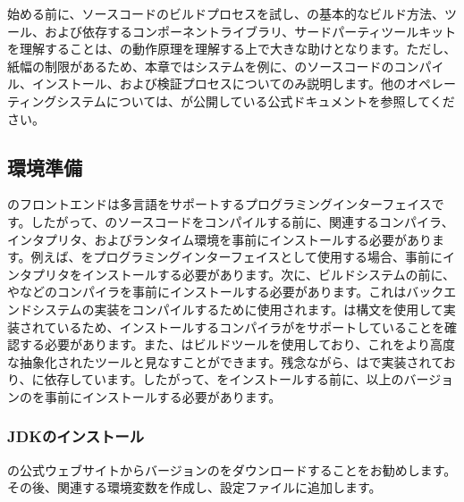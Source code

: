 \begin{content}

始める前に、\tf{}ソースコードのビルドプロセスを試し、\tf{}の基本的なビルド方法、ツール、および依存するコンポーネントライブラリ、サードパーティツールキットを理解することは、\tf{}の動作原理を理解する上で大きな助けとなります。ただし、紙幅の制限があるため、本章ではシステムを例に、\tf{}のソースコードのコンパイル、インストール、および検証プロセスについてのみ説明します。他のオペレーティングシステムについては、\tf{}が公開している公式ドキュメントを参照してください。

\subsection{環境準備}

のフロントエンドは多言語をサポートするプログラミングインターフェイスです。したがって、のソースコードをコンパイルする前に、関連するコンパイラ、インタプリタ、およびランタイム環境を事前にインストールする必要があります。例えば、をプログラミングインターフェイスとして使用する場合、事前にインタプリタをインストールする必要があります。次に、ビルドシステムの前に、やなどのコンパイラを事前にインストールする必要があります。これはバックエンドシステムの実装をコンパイルするために使用されます。は構文を使用して実装されているため、インストールするコンパイラがをサポートしていることを確認する必要があります。また、はビルドツールを使用しており、これをより高度な抽象化されたツールと見なすことができます。残念ながら、はで実装されており、に依存しています。したがって、をインストールする前に、以上のバージョンのを事前にインストールする必要があります。

\subsubsection{JDKのインストール}

の公式ウェブサイトからバージョンのをダウンロードすることをお勧めします。その後、関連する環境変数を作成し、設定ファイルに追加します。

\begin{leftbar}
\end{leftbar}


\end{content}
